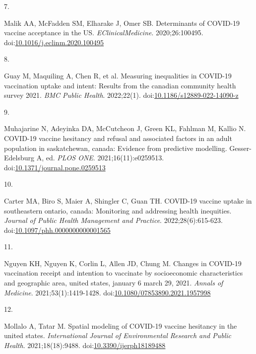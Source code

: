 \documentclass[
  letterpaper,
  DIV=11,
  numbers=noendperiod]{scrartcl}
\newlength{\cslhangindent}
\newlength{\csllabelwidth}
\newlength{\cslentryspacingunit} %
\newenvironment{CSLReferences}[2] %
 {%
  \setlength{\parindent}{0pt}
  \ifodd #1
  \let\oldpar\par
  \def\par{\hangindent=\cslhangindent\oldpar}
  \fi
  \setlength{\parskip}{#2\cslentryspacingunit}
 }%
 {}
\newcommand{\CSLLeftMargin}[1]{\parbox[t]{\csllabelwidth}{#1}}
\newcommand{\CSLRightInline}[1]{\parbox[t]{\linewidth - \csllabelwidth}{#1}\break}
\begin{document}
\begin{CSLReferences}{0}{0}
\leavevmode{}%
\CSLLeftMargin{7. }%
\CSLRightInline{Malik AA, McFadden SM, Elharake J, Omer SB. Determinants
of {COVID}-19 vaccine acceptance in the {US}.
\emph{{EClinicalMedicine}}. 2020;26:100495.
doi:\href{https://doi.org/10.1016/j.eclinm.2020.100495}{10.1016/j.eclinm.2020.100495}}

\leavevmode{}%
\CSLLeftMargin{8. }%
\CSLRightInline{Guay M, Maquiling A, Chen R, et al. Measuring
inequalities in {COVID}-19 vaccination uptake and intent: Results from
the canadian community health survey 2021. \emph{{BMC} Public Health}.
2022;22(1).
doi:\href{https://doi.org/10.1186/s12889-022-14090-z}{10.1186/s12889-022-14090-z}}

\leavevmode{}%
\CSLLeftMargin{9. }%
\CSLRightInline{Muhajarine N, Adeyinka DA, McCutcheon J, Green KL,
Fahlman M, Kallio N. {COVID}-19 vaccine hesitancy and refusal and
associated factors in an adult population in saskatchewan, canada:
Evidence from predictive modelling. Gesser-Edelsburg A, ed. \emph{{PLOS}
{ONE}}. 2021;16(11):e0259513.
doi:\href{https://doi.org/10.1371/journal.pone.0259513}{10.1371/journal.pone.0259513}}

\leavevmode{}%
\CSLLeftMargin{10. }%
\CSLRightInline{Carter MA, Biro S, Maier A, Shingler C, Guan TH.
{COVID}-19 vaccine uptake in southeastern ontario, canada: Monitoring
and addressing health inequities. \emph{Journal of Public Health
Management and Practice}. 2022;28(6):615-623.
doi:\href{https://doi.org/10.1097/phh.0000000000001565}{10.1097/phh.0000000000001565}}

\leavevmode{}%
\CSLLeftMargin{11. }%
\CSLRightInline{Nguyen KH, Nguyen K, Corlin L, Allen JD, Chung M.
Changes in {COVID}-19 vaccination receipt and intention to vaccinate by
socioeconomic characteristics and geographic area, united states,
january 6 {\textendash} march 29, 2021. \emph{Annals of Medicine}.
2021;53(1):1419-1428.
doi:\href{https://doi.org/10.1080/07853890.2021.1957998}{10.1080/07853890.2021.1957998}}

\leavevmode{}%
\CSLLeftMargin{12. }%
\CSLRightInline{Mollalo A, Tatar M. Spatial modeling of {COVID}-19
vaccine hesitancy in the united states. \emph{International Journal of
Environmental Research and Public Health}. 2021;18(18):9488.
doi:\href{https://doi.org/10.3390/ijerph18189488}{10.3390/ijerph18189488}}


\end{CSLReferences}
\end{document}
